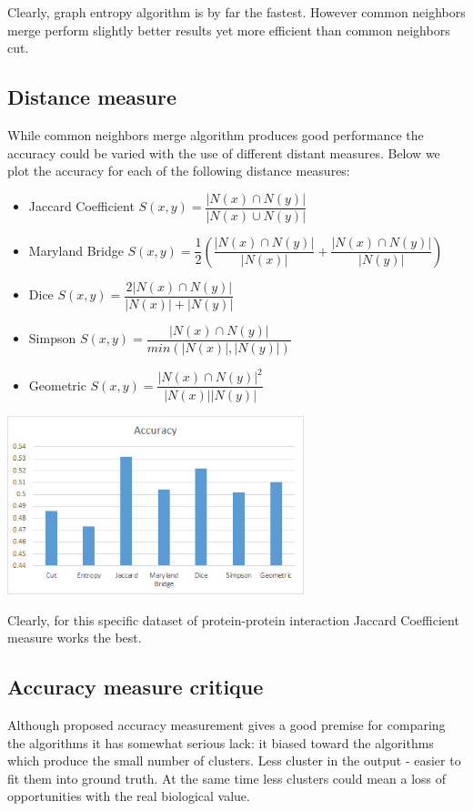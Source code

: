 \documentclass[journal]{IEEEtran}
\begin{document}
Clearly, graph entropy algorithm is by far the fastest. However common neighbors merge perform slightly better results yet more efficient than common neighbors cut. 

\subsection{Distance measure}
While common neighbors merge algorithm produces good performance the accuracy could be varied with the use of different distant measures. Below we plot the accuracy for each of the following distance measures:
\begin{itemize}
	\item Jaccard Coefficient $S(x,y)=\dfrac{|N(x) \cap N(y)|}{|N(x) \cup N(y)|}$
	\item Maryland Bridge $S(x,y)=\dfrac{1}{2} (\dfrac{|N(x) \cap N(y)|}{|N(x)|} + \dfrac{|N(x) \cap N(y)|}{|N(y)|})$
	\item Dice $S(x,y)=\dfrac{2|N(x) \cap N(y)|}{|N(x)| + |N(y)|}$
	\item Simpson $S(x,y)=\dfrac{|N(x) \cap N(y)|}{min(|N(x)|, |N(y)|)}$
	\item Geometric $S(x,y)=\dfrac{|N(x) \cap N(y)|^2}{|N(x)| |N(y)|}$
\end{itemize}

\includegraphics[width=3.4in,clip,keepaspectratio]{distance-measures}

Clearly, for this specific dataset of protein-protein interaction Jaccard Coefficient measure works the best.

\subsection{Accuracy measure critique}
Although proposed accuracy measurement gives a good premise for comparing the algorithms it has somewhat serious lack: it biased toward the algorithms which produce the small number of clusters. Less cluster in the output - easier to fit them into ground truth. At the same time less clusters could mean a loss of opportunities with the real biological value. 
\end{document}

